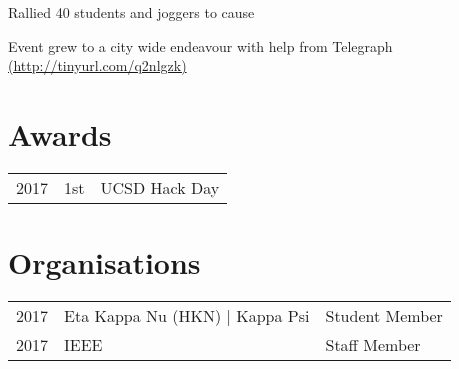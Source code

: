 \documentclass[]{deedy-resume-openfont}
\begin{document}
\begin{minipage}[t]{0.66\textwidth}
\begin{tightemize}
\item Rallied 40 students and joggers to cause
\item Event grew to a city wide endeavour with help from Telegraph \href{http://tinyurl.com/q2nlgzk}{(http://tinyurl.com/q2nlgzk)}
\end{tightemize}
\sectionsep


\section{Awards} 
\begin{tabular}{rll}
2017	     & 1st  & UCSD Hack Day\\
\end{tabular}
\sectionsep


\section{Organisations}
\begin{tabular}{rll}
2017    & Eta Kappa Nu (HKN) | Kappa Psi &Student Member\\
2017   & IEEE  & Staff Member\\
\end{tabular}
\sectionsep

\end{minipage} 
\end{document}
